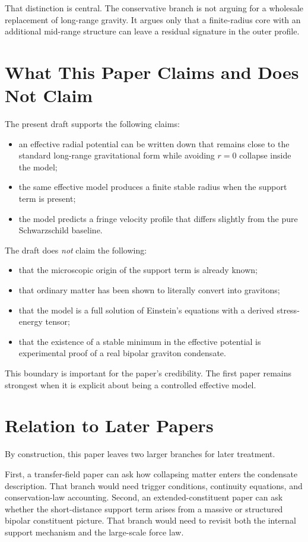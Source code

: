 \documentclass[11pt]{article}
\begin{document}
That distinction is central. The conservative branch is not arguing for a wholesale replacement of long-range gravity. It argues only that a finite-radius core with an additional mid-range structure can leave a residual signature in the outer profile.

\section{What This Paper Claims and Does Not Claim}
The present draft supports the following claims:
\begin{itemize}[leftmargin=1.25em]
  \item an effective radial potential can be written down that remains close to the standard long-range gravitational form while avoiding $r=0$ collapse inside the model;
  \item the same effective model produces a finite stable radius when the support term is present;
  \item the model predicts a fringe velocity profile that differs slightly from the pure Schwarzschild baseline.
\end{itemize}

The draft does \textit{not} claim the following:
\begin{itemize}[leftmargin=1.25em]
  \item that the microscopic origin of the support term is already known;
  \item that ordinary matter has been shown to literally convert into gravitons;
  \item that the model is a full solution of Einstein's equations with a derived stress-energy tensor;
  \item that the existence of a stable minimum in the effective potential is experimental proof of a real bipolar graviton condensate.
\end{itemize}

This boundary is important for the paper's credibility. The first paper remains strongest when it is explicit about being a controlled effective model.

\section{Relation to Later Papers}
By construction, this paper leaves two larger branches for later treatment.

First, a transfer-field paper can ask how collapsing matter enters the condensate description. That branch would need trigger conditions, continuity equations, and conservation-law accounting. Second, an extended-constituent paper can ask whether the short-distance support term arises from a massive or structured bipolar constituent picture. That branch would need to revisit both the internal support mechanism and the large-scale force law.
\end{document}
